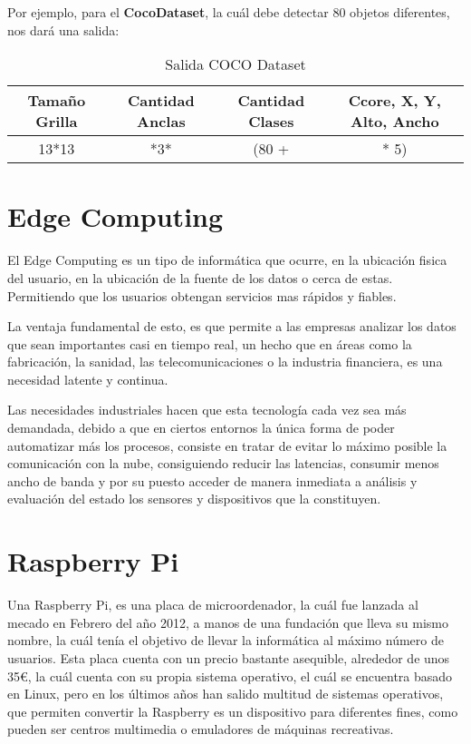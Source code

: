 
Por ejemplo, para el \textbf{CocoDataset}, la cuál debe detectar 80 objetos diferentes, nos dará una salida:

\begin{table}[h!]
    \centering
    \begin{tabular}{| c | c | c | c |}
        \hline
        Tamaño Grilla & Cantidad Anclas & Cantidad Clases & Ccore, X, Y, Alto, Ancho \\ \hline
        13*13 & *3* & (80 + & * 5) \\ \hline
    \end{tabular}
    \caption{Salida COCO Dataset}
    \label{tab:salidaYOLO}
\end{table}

\section{Edge Computing}

El Edge Computing \cite{edgeComputing} es un tipo de informática que ocurre, en la ubicación fisica del usuario, en la ubicación de la fuente de los datos o cerca de estas. Permitiendo 
que los usuarios obtengan servicios mas rápidos y fiables.

La ventaja fundamental de esto, es que permite a las empresas analizar los datos que sean importantes casi en tiempo real, un hecho que en áreas como la fabricación, la sanidad,
las telecomunicaciones o la industria financiera, es una necesidad latente y continua.

Las necesidades industriales hacen que esta tecnología cada vez sea más demandada, debido a que en ciertos entornos la única forma de poder automatizar más los procesos, consiste en tratar
de evitar lo máximo posible la comunicación con la nube, consiguiendo reducir las latencias, consumir menos ancho de banda y por su puesto acceder de manera inmediata a análisis y evaluación
del estado los sensores y dispositivos que la constituyen.


\section{Raspberry Pi}

Una Raspberry Pi, \cite{raspberry} es una placa de microordenador, la cuál fue lanzada al mecado en Febrero del año 2012, a manos de una fundación que lleva su mismo nombre, la cuál tenía el objetivo de llevar la informática al máximo número de usuarios.
Esta placa cuenta con un precio bastante asequible, alrededor de unos 35€, la cuál cuenta con su propia sistema operativo, el cuál se encuentra basado en Linux, pero en los últimos años han salido multitud de sistemas operativos, que permiten convertir 
la Raspberry es un dispositivo para diferentes fines, como pueden ser centros multimedia o emuladores de máquinas recreativas.

